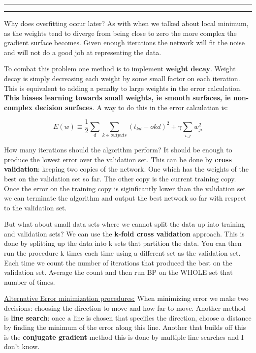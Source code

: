 \documentclass[11pt]{article}
\newcounter{questionCounter}
\newcounter{partCounter}[questionCounter]
\newenvironment{question}[2][\arabic{questionCounter}]{%
    \addtocounter{questionCounter}{1}%
    \setcounter{partCounter}{0}%
    \vspace{.25in} \hrule \vspace{0.5em}%
        \noindent{\bf #1: #2}%
    \vspace{0.8em} \hrule \vspace{.10in}%
}{}
\begin{document}
\begin{question}{Nueral Nets: }
Why does overfitting occur later? As with when we talked about local minimum, as the weights tend to
diverge from being close to zero the more complex the gradient surface becomes. Given enough iterations
the network will fit the noise and will not do a good job at representing the data.

To combat this problem one method is to implement \textbf{weight decay}. Weight decay is simply decreasing each
weight by some small factor on each iteration. This is equivalent to adding a penalty to large weights in
the error calculation. \textbf{This biases learning towards small weights, ie smooth surfaces, ie non-complex
decision surfaces}. A way to do this in the error calculation is:





$$E(w) \equiv \frac{1}{2} \displaystyle\sum\limits_{d} \displaystyle\sum\limits_{k\in outputs}(t_{kd} - o{kd})^2 + \gamma
\displaystyle\sum\limits_{i,j}w_{ji}^2$$

How many iterations should the algorithm perform? It should be enough to produce the lowest error over
the validation set. This can be done by \textbf{cross validation}: keeping two copies of the network. One which has the weights of
the best on the validation set so far. The other copy is the current training copy. Once the error
on the training copy is siginficantly lower than the validation set we can terminate the algorithm
and output the best network so far with respect to the validation set.

But what about small data sets where we cannot split the data up into training and validation sets? We can
use the \textbf{k-fold cross validation} approach. This is done by splitting up the data into k sets that
partition the data. You can then run the procedure k times each time using a different set as the validation
set. Each time we count the number of iterations that produced the best on the validation set. Average the 
count and then run BP on the WHOLE set that number of times.

\underline{Alternative Error minimization procedures:}
When minimizing error we make two decisions: choosing the direction to move and how far to move. Another
method is \textbf{line search}: once a line is chosen that specifies the direction, choose a distance by finding
the minimum of the error along this line. Another that builds off this is the \textbf{conjugate gradient} method
this is done by multiple line searches and I don't know.



\end{question}
\end{document}
